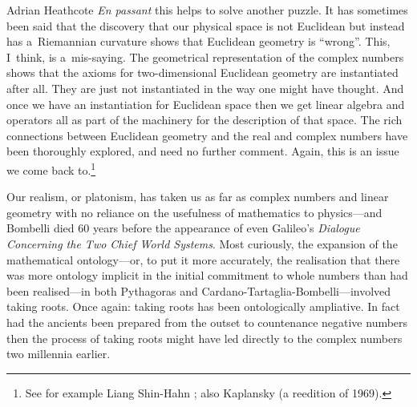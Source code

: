\begin{artengenv}{Adrian Heathcote}
\textit{En passant} this helps to solve another puzzle. It has sometimes been said that the discovery that our physical space is not Euclidean but instead has a~Riemannian curvature shows that Euclidean geometry is ``wrong''. This, I~think, is a~mis-saying. The geometrical representation of the complex numbers shows that the axioms for two-dimensional Euclidean geometry are instantiated after all. They are just not instantiated in the way one might have thought. And once we have an instantiation for Euclidean space then we get linear algebra and operators all as part of the machinery for the description of that space. The rich connections between Euclidean geometry and the real and complex numbers have been thoroughly explored, and need no further comment. Again, this is an issue we come back to.\footnote{See for example Liang Shin-Hahn \parencite*{hahn_complex_1994}; also Kaplansky \parencite*{kaplansky_linear_2003} (a reedition of 1969).}

Our realism, or platonism, has taken us as far as complex numbers and linear geometry with no reliance on the usefulness of mathematics to physics---and Bombelli died 60 years before the appearance of even Galileo's \textit{Dialogue Concerning the Two Chief World Systems}. Most curiously, the expansion of the mathematical ontology---or, to put it more accurately, the realisation that there was more ontology implicit in the initial commitment to whole numbers than had been realised---in both Pythagoras and Cardano-Tartaglia-Bombelli---involved taking roots. Once again: taking roots has been ontologically ampliative. In fact had the ancients been prepared from the outset to countenance negative numbers then the process of taking roots might have led directly to the complex numbers two millennia earlier.


\end{artengenv}
